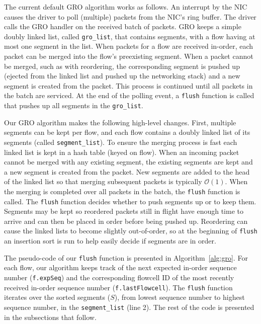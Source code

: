 The current default GRO algorithm works as follows. An interrupt by the NIC causes the driver to poll
(multiple) packets from the NIC's ring buffer. The driver calls the GRO handler on the received batch
of packets. GRO keeps a simple doubly linked list, called {\tt gro\_list}, that contains 
segments, with a flow having at most one segment in the list. When packets for a flow are
received in-order, each packet can be merged into the flow's preexisting segment. When a packet
cannot be merged, such as with reordering, the corresponding segment is pushed up (ejected from the
linked list and pushed up the networking stack) and a new segment is created from the packet. 
This process is continued until all packets in the batch are serviced. At the end 
of the polling event, a {\tt flush} function is called that pushes up all segments in the
{\tt gro\_list}.

Our GRO algorithm makes the following high-level changes. First, multiple segments can be
kept per flow, and each flow contains a doubly linked list of its segments (called {\tt segment\_list}). 
To ensure the merging process is fast each linked list is kept in a hash table (keyed on flow).
When an incoming packet cannot be merged with any existing segment, the existing
segments are kept and a new segment is created from the packet.
New segments are added to the head of the linked list so that merging subsequent packets is typically $\mathcal{O}(1)$.
When the merging is completed over all packets in the batch, the {\tt flush} function is called. 
The {\tt flush} function decides whether to push segments up or to keep them. Segments may 
be kept so reordered packets still in flight have enough time to arrive and can then be placed in order
before being pushed up. 
Reordering can cause the linked lists to become slightly out-of-order, so
at the beginning of {\tt flush} an insertion sort is run to help easily decide if segments are in order.

The pseudo-code of our {\tt flush} function is presented in Algorithm~\ref{alg:gro}.
For each flow, our algorithm keeps track of the next expected in-order
sequence number ({\tt f.expSeq}) and the corresponding flowcell ID
of the most recently received in-order sequence number ({\tt f.lastFlowcell}).
The {\tt flush} function iterates over 
the sorted segments ($S$), from lowest sequence number to highest sequence number, in the {\tt segment\_list} (line 2).
The rest of the code is presented in the subsections that follow.


